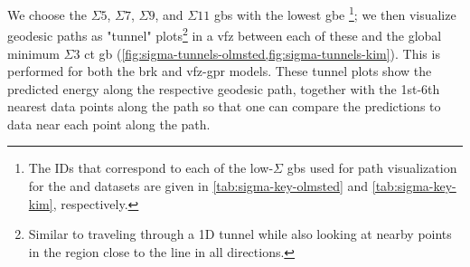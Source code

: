 \documentclass[final,twocolumn,12pt]{elsarticle}
\begin{document}
    We choose the $\Sigma5$, $\Sigma7$, $\Sigma9$, and $\Sigma11$ \glspl{gb} with the lowest \gls{gbe} \footnote{The IDs that correspond to each of the low-$\Sigma$ \glspl{gb} used for path visualization for the \citet{olmstedSurveyComputedGrain2009a} and \citet{kimPhasefieldModeling3D2014} datasets are given in \cref{tab:sigma-key-olmsted} and \cref{tab:sigma-key-kim}, respectively. }; we then visualize geodesic paths as "tunnel" plots\footnote{Similar to traveling through a 1D tunnel while also looking at nearby points in the region close to the line in all directions.} in a \gls{vfz} between each of these and the global minimum $\Sigma3$ \gls{ct} \gls{gb} (\cref{fig:sigma-tunnels-olmsted,fig:sigma-tunnels-kim}). This is performed for both the \gls{brk} and \gls{vfz}-\gls{gpr} models. These tunnel plots show the predicted energy along the respective geodesic path, together with the 1st-6th nearest data points along the path so that one can compare the predictions to data near each point along the path.
\end{document}
